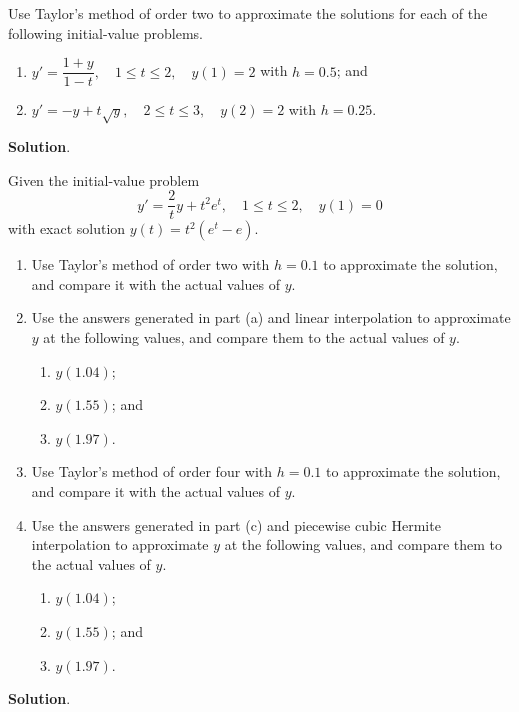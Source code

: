\documentclass[11pt]{article}
\theoremstyle{break}
\numberwithin{equation}{theorem}
\begin{document}
\newpage
\begin{problem}\label{problem 5} %
    Use Taylor's method of order two to approximate the solutions for each of the following initial-value problems.
    \begin{enumerate}
        \item $y'=\dfrac{1+y}{1-t}, \quad 1\leq t\leq 2, \quad y(1)=2$ with $h=0.5$; and
        \item $y'=-y+t\sqrt{y}, \quad 2\leq t\leq 3, \quad y(2)=2$ with $h=0.25$.
    \end{enumerate}
\end{problem}
\textbf{Solution}. 


\newpage
\begin{problem}\label{problem 6} %
    Given the initial-value problem $$y'=\dfrac{2}{t}y+t^2e^t, \quad 1\leq t\leq 2, \quad y(1)=0$$ with exact solution $y(t)=t^2(e^t-e)$.
    \begin{enumerate}
        \item Use Taylor's method of order two with $h = 0.1$ to approximate the solution, and compare it with the actual values of $y$.
        \item Use the answers generated in part (a) and linear interpolation to approximate $y$ at the following values, and compare them to the actual values of $y$.
        \begin{enumerate}[label=\roman*.]
            \item $y(1.04)$;
            \item $y(1.55)$; and
            \item $y(1.97)$.
        \end{enumerate}
        \item Use Taylor's method of order four with $h = 0.1$ to approximate the solution, and compare it with the actual values of $y$.
        \item Use the answers generated in part (c) and piecewise cubic Hermite interpolation to approximate $y$ at the following values, and compare them to the actual values of $y$.
        \begin{enumerate}[label=\roman*.]
            \item $y(1.04)$;
            \item $y(1.55)$; and
            \item $y(1.97)$.
        \end{enumerate}
    \end{enumerate}
\end{problem}
\textbf{Solution}. 
\end{document}

